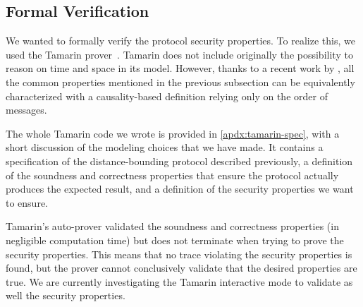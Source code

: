 \subsection{Formal Verification}

We wanted to formally verify the protocol security properties. To realize this, 
we used the Tamarin prover~\cite{meier2013tamarin}. Tamarin does not include 
originally the possibility to reason on time and space in its model.
However, thanks to a recent work by \textcite{TamarinDB}, all the common 
properties mentioned in the previous subsection can be equivalently 
characterized with a causality-based definition relying only on the order of 
messages.

The whole Tamarin code we wrote is provided in \cref{apdx:tamarin-spec}, with a short discussion of the modeling choices that we have made. 
It contains a specification of the distance-bounding protocol described previously, a definition of the soundness and correctness properties that ensure the protocol actually produces the expected result, and a definition of the security properties we want to ensure.

Tamarin's auto-prover validated the soundness and correctness properties (in negligible computation time) but does not terminate when trying to prove the security properties.
This means that no trace violating the security properties is found, but the prover cannot conclusively validate that the desired properties are true. 
We are currently investigating the Tamarin interactive mode to validate as well the security properties.


